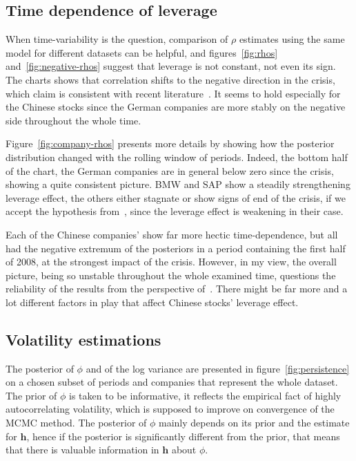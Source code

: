 \subsection{Time dependence of leverage}

When time-variability is the question, comparison of $\rho$ estimates using the same model for different datasets can be helpful, and figures~\ref{fig:rhos} and~\ref{fig:negative-rhos} suggest that leverage is not constant, not even its sign.
The charts shows that correlation shifts to the negative direction in the crisis, which claim is consistent with recent literature~\citep{christensen2015impact}.
It seems to hold especially for the Chinese stocks since the German companies are more stably on the negative side throughout the whole time.

Figure~\ref{fig:company-rhos} presents more details by showing how the posterior distribution changed with the rolling window of periods.
Indeed, the bottom half of the chart, the German companies are in general below zero since the crisis, showing a quite consistent picture.
BMW and SAP show a steadily strengthening leverage effect, the others either stagnate or show signs of end of the crisis, if we accept the hypothesis from~\citeauthor{Christensen2015}, since the leverage effect is weakening in their case.

Each of the Chinese companies' show far more hectic time-dependence, but all had the negative extremum of the posteriors in a period containing the first half of 2008, at the strongest impact of the crisis.
However, in my view, the overall picture, being so unstable throughout the whole examined time, questions the reliability of the results from the perspective of~\citeauthor{Christensen2015}.
There might be far more and a lot different factors in play that affect Chinese stocks' leverage effect.

\subsection{Volatility estimations}

The posterior of $\phi$ and of the log variance are presented in figure~\ref{fig:persistence} on a chosen subset of periods and companies that represent the whole dataset.
The prior of $\phi$ is taken to be informative, it reflects the empirical fact of highly autocorrelating volatility, which is supposed to improve on convergence of the MCMC method.
The posterior of $\phi$ mainly depends on its prior and the estimate for $\bm h$, hence if the posterior is significantly different from the prior, that means that there is valuable information in $\bm h$ about $\phi$.

